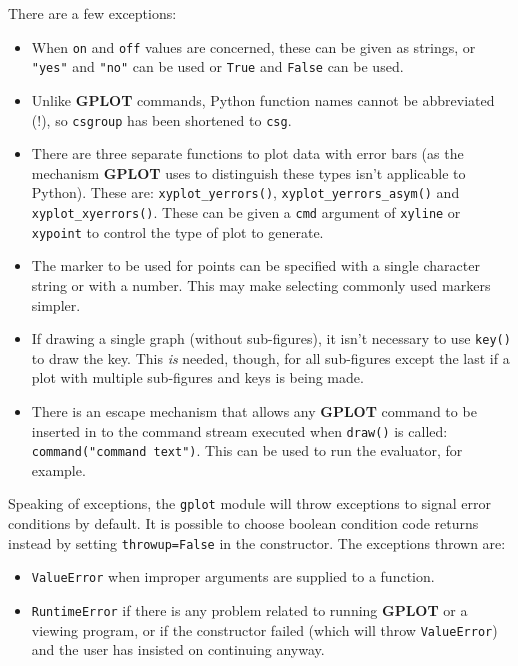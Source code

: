 \documentclass[a4paper,twoside,11pt]{article}
\newcommand{\newpara}{\par\vspace{4mm}\noindent}
\begin{document}
\newpara
There are a few exceptions:
\begin{itemize}
\item When \texttt{on} and \texttt{off} values are concerned, these can be given as strings, or
\texttt{"yes"} and \texttt{"no"} can be used or \texttt{True} and \texttt{False} can be used.
\item  Unlike \textbf{GPLOT} commands, Python function names cannot be abbreviated (!), so
\texttt{csgroup} has been shortened to \texttt{csg}. 
\item  There are three separate functions to plot data with error bars (as the mechanism \textbf{GPLOT} uses to distinguish
these types isn't applicable to Python). These are: \texttt{xyplot\_yerrors()},
\texttt{xyplot\_yerrors\_asym()} and \texttt{xyplot\_xyerrors()}.
These can be given a \texttt{cmd} argument of \texttt{xyline} or \texttt{xypoint} to control the type of
  plot to generate.
\item  The marker to be used for points can be specified with a single character string or with a number. This
  may make selecting commonly used markers simpler.
\item  If drawing a single graph (without sub-figures), it isn't necessary to use \texttt{key()} to draw the key.
  This \emph{is}
  needed, though, for all sub-figures except the last if a plot with multiple sub-figures and keys is being
  made.
\item There is an escape mechanism that allows any \textbf{GPLOT} command to be inserted in to the command stream
  executed when \texttt{draw()} is called: \texttt{command("command text")}. This can be used to run the evaluator,
  for example.
\end{itemize}

\newpara
Speaking of exceptions, the \texttt{gplot} module will throw exceptions to signal error conditions by default. It is 
possible to choose boolean condition code returns instead by setting \texttt{throwup=False} in the constructor. The
exceptions thrown are:
\begin{itemize}
\item \texttt{ValueError} when improper arguments are supplied to a function.
\item \texttt{RuntimeError} if there is any problem related to running \textbf{GPLOT} or a viewing program, or if the
  constructor failed (which will throw \texttt{ValueError}) and the user has insisted on continuing anyway.
\end{itemize}
\end{document}

